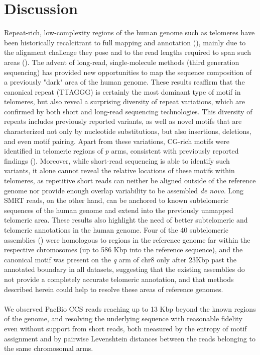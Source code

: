 \documentclass{article}
\newcommand{\citep}[1]{(\cite{#1})}
\begin{document}
\section*{Discussion} 
Repeat-rich, low-complexity regions of the human genome such as telomeres have been historically recalcitrant to full mapping and annotation \citep{miga2015}, mainly due to the alignment challenge they pose and to the read lengths required to span such areas \citep{ngslowcomplexity}.
The advent of long-read, single-molecule methods (third generation sequencing) has provided new opportunities to map the sequence composition of a previously "dark" area of the human genome.
These results reaffirm that the canonical repeat (TTAGGG) is certainly the most dominant type of motif in telomeres, but also reveal a surprising diversity of repeat variations, which are confirmed by both short and long-read sequencing technologies.
This diversity of repeats includes previously reported variants, as well as novel motifs that are characterized not only by nucleotide substitutions, but also insertions, deletions, and even motif pairing.
Apart from these variations, CG-rich motifs were identified in telomeric regions of \textit{p} arms, consistent with previously reported findings \citep{cpg}.
Moreover, while short-read sequencing is able to identify such variants, it alone cannot reveal the relative locations of these motifs within telomeres, as repetitive short reads can neither be aligned outside of the reference genome nor provide enough overlap variability to be assembled \textit{de novo}.
Long SMRT reads, on the other hand, can be anchored to known subtelomeric sequences of the human genome and extend into the previously unmapped telomeric area.
These results also highlight the need of better subtelomeric and telomeric annotations in the human genome.
Four of the 40 subtelomeric assemblies \citep{riethman2014} were homologous to regions in the reference genome far within the respective chromosomes (up to 586 Kbp into the reference sequence), and the canonical motif was present on the \textit{q} arm of chr8 only after 2\textendash{}3Kbp past the annotated boundary in all datasets, suggesting that the existing assemblies do not provide a completely accurate telomeric annotation, and that methods described herein could help to resolve these areas of reference genomes.
\\~\\
We observed PacBio CCS reads reaching up to 13 Kbp beyond the known regions of the genome, and resolving the underlying sequence with reasonable fidelity \textendash{} even without support from short reads, \textendash{} both measured by the entropy of motif assignment and by pairwise Levenshtein distances between the reads belonging to the same chromosomal arms.
\end{document}
